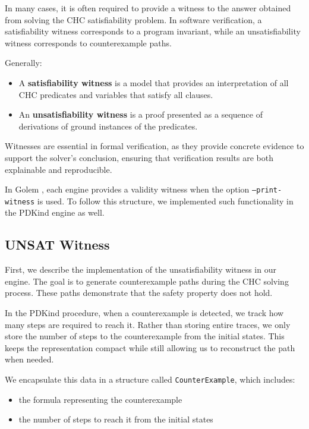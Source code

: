 \noindent In many cases, it is often required to provide a witness to the
answer obtained from solving the CHC satisfiability problem. In software
verification, a satisfiability witness corresponds to a program invariant,
while an unsatisfiability witness corresponds to counterexample paths.

Generally:
\begin{itemize}
    \item A \textbf{satisfiability witness} is a model that provides an interpretation of all CHC predicates and variables that satisfy all clauses.
    \item An \textbf{unsatisfiability witness} is a proof presented as a sequence of derivations of ground instances of the predicates. 
\end{itemize}

Witnesses are essential in formal verification, as they provide concrete
evidence to support the solver's conclusion, ensuring that verification results
are both explainable and reproducible.

In Golem \cite{blicha_golem_2023}, each engine provides a validity witness when
the option \texttt{--print-witness} is used. To follow this structure, we
implemented such functionality in the PDKind engine as well.

\subsection*{UNSAT Witness} \label{UNSATWit}

\noindent First, we describe the implementation of the unsatisfiability witness
in our engine. The goal is to generate counterexample paths during the CHC
solving process. These paths demonstrate that the safety property does not
hold.

In the PDKind procedure, when a counterexample is detected, we track how many
steps are required to reach it. Rather than storing entire traces, we only
store the number of steps to the counterexample from the initial states. This
keeps the representation compact while still allowing us to reconstruct the
path when needed.

We encapsulate this data in a structure called \texttt{CounterExample}, which includes:
\begin{itemize}
    \item the formula representing the counterexample
    \item the number of steps to reach it from the initial states
\end{itemize}

